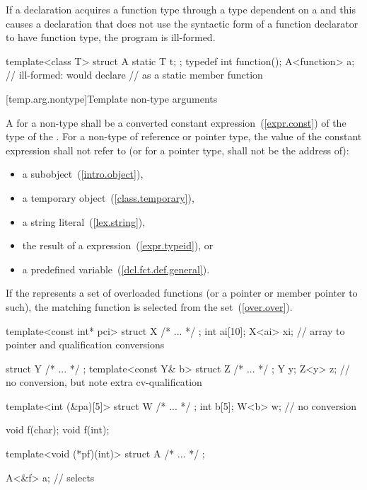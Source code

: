 \pnum
If a declaration acquires a function type through a type dependent on a
and this causes a declaration that does not use the
syntactic form of a function declarator to have function type,
the program is ill-formed.
\enterexample

\begin{codeblock}
template<class T> struct A {
  static T t;
};
typedef int function();
A<function> a;                  // ill-formed: would declare 
                                // as a static member function
\end{codeblock}
\exitexample

[temp.arg.nontype]{Template non-type arguments}

\pnum
A
for a non-type
shall be
a converted
constant expression~(\ref{expr.const})
of the type of the .
For a non-type  of reference or pointer type,
the value of the constant expression shall not refer to
(or for a pointer type, shall not be the address of):

\begin{itemize}
\item a subobject~(\ref{intro.object}),
\item a temporary object~(\ref{class.temporary}),
\item a string literal~(\ref{lex.string}),
\item the result of a  expression~(\ref{expr.typeid}), or
\item a predefined  variable~(\ref{dcl.fct.def.general}).
\end{itemize}

\enternote
If the 
represents a set of overloaded functions
(or a pointer or member pointer to such),
the matching function is selected from the set~(\ref{over.over}).
\exitnote

\pnum
\enterexample
\begin{codeblock}
template<const int* pci> struct X { /* ... */ };
int ai[10];
X<ai> xi;                       // array to pointer and qualification conversions

struct Y { /* ... */ };
template<const Y& b> struct Z { /* ... */ };
Y y;
Z<y> z;                         // no conversion, but note extra cv-qualification

template<int (&pa)[5]> struct W { /* ... */ };
int b[5];
W<b> w;                         // no conversion

void f(char);
void f(int);

template<void (*pf)(int)> struct A { /* ... */ };

A<&f> a;                        // selects 
\end{codeblock}
\exitexample

